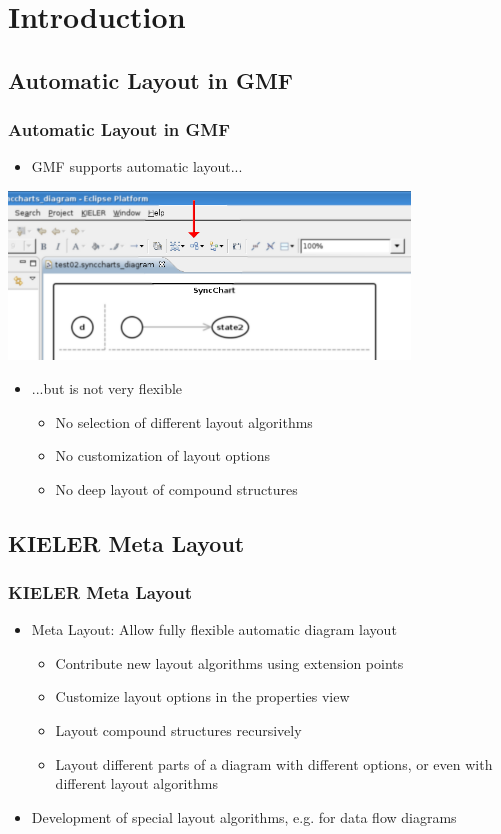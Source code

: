\section{Introduction}

\subsection{Automatic Layout in GMF}
\begin{frame}
  \frametitle{Automatic Layout in GMF}
  \begin{itemize}
    \item GMF supports automatic layout...
  \end{itemize}
  \begin{center}
    \includegraphics[width=0.8\textwidth]{images/gmf_layout.png}
  \end{center}
  \begin{itemize}
    \item<2> ...but is not very flexible
      \begin{itemize}
        \item No selection of different layout algorithms
        \item No customization of layout options
        \item No deep layout of compound structures
      \end{itemize}
  \end{itemize}
\end{frame}

\subsection{KIELER Meta Layout}
\begin{frame}
  \frametitle{KIELER Meta Layout}
  \begin{itemize}
    \item \alert{Meta} Layout: Allow fully flexible automatic diagram layout
      \begin{itemize}
        \item<2-> Contribute new layout algorithms using extension points
        \item<3-> Customize layout options in the properties view
        \item<4-> Layout compound structures recursively
        \item<5-> Layout different parts of a diagram with different
          options, or even with different layout algorithms
      \end{itemize}
    \item<6-> Development of special layout algorithms, e.g. for \alert{data
      flow diagrams}
  \end{itemize}
\end{frame}

